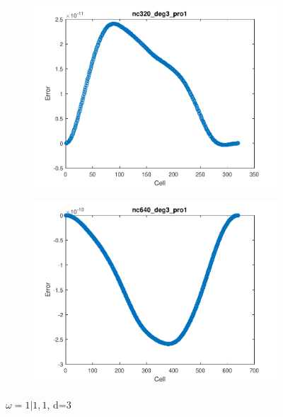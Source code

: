 \documentclass[11pt,a4paper]{article}
\theoremstyle{plain}
\theoremstyle{definition}
\begin{document}
\begin{figure}[H]
\medskip
\begin{subfigure}[b]{0.48\textwidth}
\includegraphics[width=\linewidth]{../../tests_01_01/test_01_01_test47_pro1/output/plots/nc320_deg3_wei111_pro1.pdf}
\end{subfigure}\hspace*{\fill}
\begin{subfigure}[b]{0.48\textwidth}
\includegraphics[width=\linewidth]{../../tests_01_01/test_01_01_test47_pro1/output/plots/nc640_deg3_wei111_pro1.pdf}
\end{subfigure}

\caption{$\omega=1|1,1$, d=3}
\end{figure}
\end{document}
